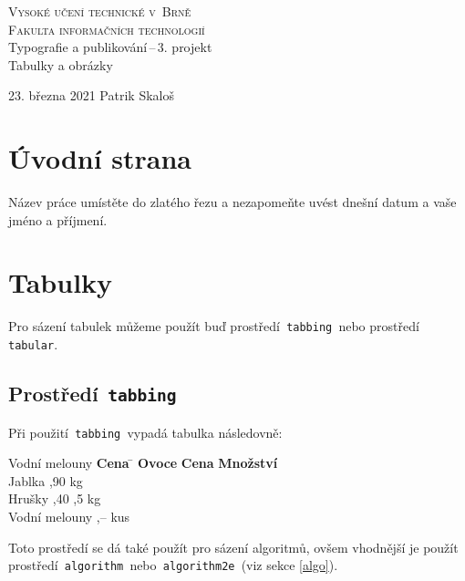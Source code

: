 \documentclass[a4paper, 11pt]{article}
\begin{document}
  \begin{titlepage}
    \begin{center}
      \Huge
      \textsc{Vysoké učení technické v~Brně} \\
      \huge\textsc{Fakulta informačních technologií} \\
      \LARGE
      Typografie a publikování\,--\,3. projekt\\
      \Huge
      Tabulky a obrázky\\
    \end{center}
    {\Large 23. března 2021\hfill
    Patrik Skaloš}
  \end{titlepage}

  \section{Úvodní strana}
  Název práce umístěte do zlatého řezu a nezapomeňte uvést dnešní datum a vaše
  jméno a příjmení.

  \section{Tabulky}
  Pro sázení tabulek můžeme použít buď prostředí\texttt{ tabbing }nebo
  prostředí\texttt{ tabular}.

  \subsection{Prostředí\texttt{ tabbing }}
  Při použití\texttt{ tabbing }vypadá tabulka následovně:
  \begin{tabbing}
    Vodní melouny \quad \= \textbf{Cena} \quad \= \kill
    \textbf{Ovoce} \> \textbf{Cena} \> \textbf{Množství} \\
    Jablka ,90  kg \\
    Hrušky ,40 ,5 kg \\
    Vodní melouny ,--  kus \\
  \end{tabbing}
  Toto prostředí se dá také použít pro sázení algoritmů, ovšem vhodnější je
  použít prostředí\texttt{ algorithm }nebo\texttt{ algorithm2e }(viz sekce \ref{algo}).
\end{document}
